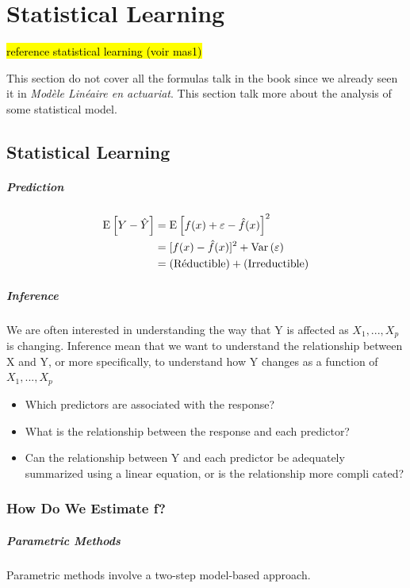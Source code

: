 
\chapter{Statistical Learning}
\hl{reference statistical learning (voir mas1)}

This section do not cover all the formulas talk in the book since we already seen it in \emph{Modèle Linéaire en actuariat}. This section talk more about the analysis of some statistical model.

\section{Statistical Learning}

\paragraph{Prediction}
\begin{align*}
    \mathrm{E}_{} \left[ Y - \hat{Y} \right] &= \mathrm{E}_{} \left[ f(x) + \varepsilon - \hat{f}(x) \right]^2 \\
                      &= [f(x) - \hat{f}(x)]^2 + \mathrm{Var} \left( \varepsilon \right) \\
                      &= (\text{Réductible}) + (\text{Irreductible)}
\end{align*}

\paragraph{Inference}
We are often interested in understanding the way that Y is affected as $X_1,...,X_p$ is changing. Inference mean that we want to understand the relationship between X and Y, or more specifically, to understand how Y changes as a function of $X_1,...,X_p$ 
\begin{itemize}
    \item Which predictors are associated with the response?
    \item What is the relationship between the response and each predictor?
    \item Can the relationship between Y and each predictor be adequately summarized using a linear equation, or is the relationship more compli cated?
\end{itemize}

\subsection{How Do We Estimate f?}
\paragraph{Parametric Methods}
Parametric methods involve a two-step model-based approach.

